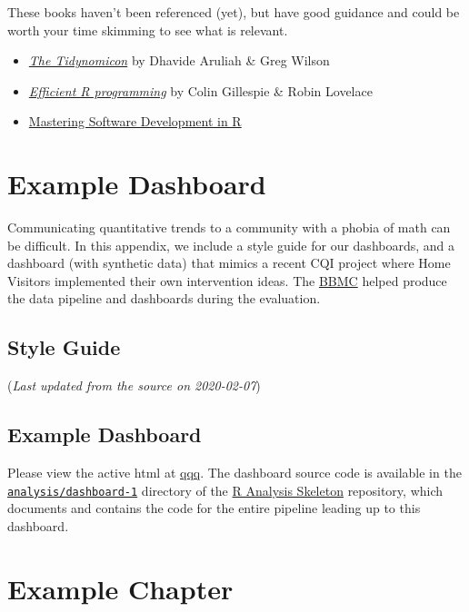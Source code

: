 \documentclass[
]{book}
\begin{document}
These books haven't been referenced (yet), but have good guidance and could be worth your time skimming to see what is relevant.

\begin{itemize}
\item
  \href{http://tidynomicon.tech/}{\emph{The Tidynomicon}} by Dhavide Aruliah \& Greg Wilson
\item
  \href{https://bookdown.org/csgillespie/efficientR/}{\emph{Efficient R programming}} by Colin Gillespie \& Robin Lovelace
\item
  \href{https://bookdown.org/rdpeng/RProgDA/}{Mastering Software Development in R}
\end{itemize}

\hypertarget{example-dashboard}{%
\chapter{Example Dashboard}\label{example-dashboard}}

Communicating quantitative trends to a community with a phobia of math can be difficult. In this appendix, we include a style guide for our dashboards, and a dashboard (with synthetic data) that mimics a recent CQI project where Home Visitors implemented their own intervention ideas. The \href{https://ouhsc.edu/bbmc/}{BBMC} helped produce the data pipeline and dashboards during the evaluation.

\hypertarget{style-guide}{%
\section{Style Guide}\label{style-guide}}

(\emph{Last updated from the source on 2020-02-07})

\hypertarget{example-dashboard-1}{%
\section{Example Dashboard}\label{example-dashboard-1}}

Please view the active html at \href{}{qqq}. The dashboard source code is available in the \href{https://github.com/wibeasley/RAnalysisSkeleton/tree/master/analysis/dashboard-1}{\texttt{analysis/dashboard-1}} directory of the \href{https://github.com/wibeasley/RAnalysisSkeleton}{R Analysis Skeleton} repository, which documents and contains the code for the entire pipeline leading up to this dashboard.

\hypertarget{example-chapter}{%
\chapter{Example Chapter}\label{example-chapter}}
\end{document}
